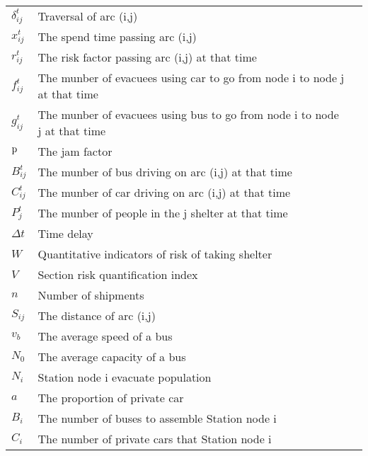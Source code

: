 \documentclass{mcmthesis}
\begin{document}
\begin{center}
\begin{longtable}{p{}p{}m{}}
$\delta _{ij}^t$       & Traversal of arc (i,j)                                  \\
$x_{ij}^t$       & The spend time passing arc (i,j)                                         \\
$r_{ij}^t$       & The risk factor passing arc (i,j) at that time                            \\
$f_{ij}^t$       & The munber of evacuees using car to go from node i to node j at that time \\
$g_{ij}^t$       & The munber of evacuees using bus to go from node i to node j at that time \\
$\rm{p}$      & The jam factor                                                            \\
$B_{ij}^t$       & The munber of bus driving on arc (i,j) at that time                      \\
$C_{ij}^t$       & The munber of car driving on arc (i,j) at that time                      \\
$P_j^t$       & The munber of people in the j shelter at that time                       \\
$\Delta t$       & Time delay                                                                \\
$W$       & Quantitative indicators of risk of taking shelter                         \\
$V$       & Section risk quantification index                                         \\
$n$       & Number of shipments                                                     \\
$S_{ij}$       & The distance of arc (i,j)                                                \\
$v_b$       & The average speed of a bus                                                \\
$N_0$       & The average capacity of a bus                                             \\
$N_i$       & Station node i evacuate population                                        \\
$a$       & The proportion of private car                                           \\
$B_i$       & The number of buses to assemble Station node i                            \\
$C_i$       & The number of private cars that Station node i                            \\

\end{longtable}
\end{center}
\end{document}
